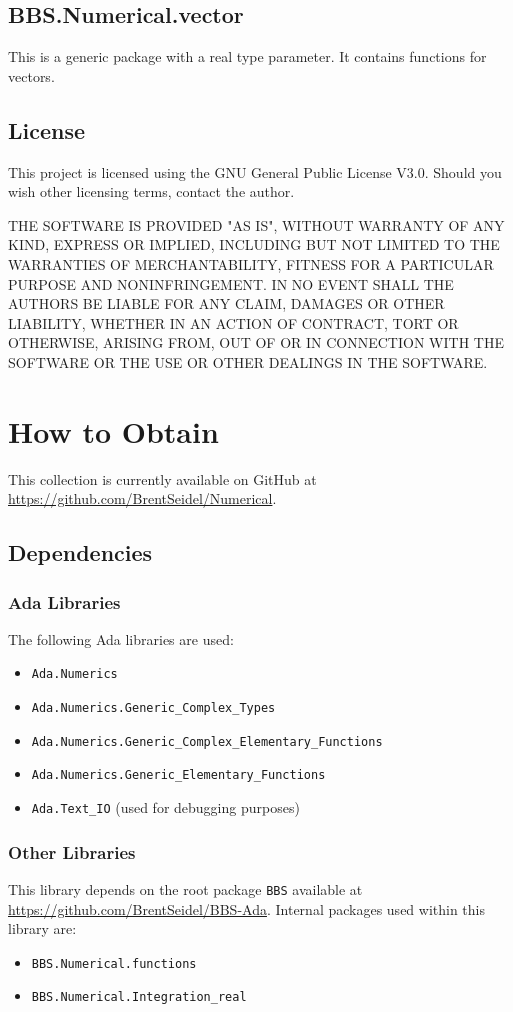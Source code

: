 \documentclass[10pt, openany]{book}
\newcommand{\package}[1]{\texttt{#1}}
\begin{document}
\section{BBS.Numerical.vector}
This is a generic package with a real type parameter.  It contains functions for vectors.

\section{License}
This project is licensed using the GNU General Public License V3.0.  Should you wish other licensing terms, contact the author.

THE SOFTWARE IS PROVIDED "AS IS", WITHOUT WARRANTY OF ANY KIND, EXPRESS OR IMPLIED, INCLUDING BUT NOT LIMITED TO THE WARRANTIES OF MERCHANTABILITY, FITNESS FOR A PARTICULAR PURPOSE AND NONINFRINGEMENT. IN NO EVENT SHALL THE AUTHORS BE LIABLE FOR ANY CLAIM, DAMAGES OR OTHER LIABILITY, WHETHER IN AN ACTION OF CONTRACT, TORT OR OTHERWISE, ARISING FROM, OUT OF OR IN CONNECTION WITH THE SOFTWARE OR THE USE OR OTHER DEALINGS IN THE SOFTWARE.

\chapter{How to Obtain}

This collection is currently available on GitHub at \url{https://github.com/BrentSeidel/Numerical}.

\section{Dependencies}
\subsection{Ada Libraries}
The following Ada libraries are used:
\begin{itemize}
  \item \package{Ada.Numerics}
  \item \package{Ada.Numerics.Generic\_Complex\_Types}
  \item \package{Ada.Numerics.Generic\_Complex\_Elementary\_Functions}
  \item \package{Ada.Numerics.Generic\_Elementary\_Functions}
  \item \package{Ada.Text\_IO} (used for debugging purposes)
\end{itemize}
\subsection{Other Libraries}
This library depends on the root package \package{BBS} available at \url{https://github.com/BrentSeidel/BBS-Ada}.
Internal packages used within this library are:
\begin{itemize}
  \item \package{BBS.Numerical.functions}
  \item \package{BBS.Numerical.Integration\_real}
\end{itemize}
\end{document}
